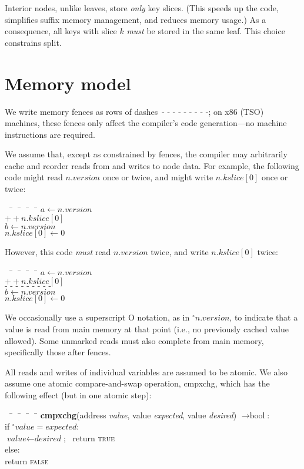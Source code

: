 \documentclass[11pt]{article}
\makeatletter
\newcommand{\FALSE}{\textsc{false}}
\newcommand{\TRUE}{\textsc{true}}
\newcommand{\V}[1]{\textit{#1}}
\newcommand{\readnow}[1]{\ensuremath{{}^\circ#1}}
\newcommand{\fencebase}{\text{- - - - - - - - -}}
\newcommand{\fence}{\ensuremath{\fencebase}}
\newcommand{\Returns}[1]{\ensuremath{\rightarrow\text{#1}}}
\newenvironment{programtabbing}%
  {\begingroup\parskip\z@\begin{tabbing}\quad\qquad~~\= \quad~~\= \quad~~\= \quad~~\=\kill}%
  {\unskip\end{tabbing}\endgroup}
\makeatother
\begin{document}
Interior nodes, unlike leaves, store \emph{only} key slices. (This
speeds up the code, simplifies suffix memory management, and reduces
memory usage.) As a consequence, all keys with slice \(k\) \emph{must}
be stored in the same leaf. This choice constrains split.


\section{Memory model}

We write memory fences as rows of dashes\ \fence; on x86 (TSO) machines,
these fences only affect the compiler's code generation---no machine
instructions are required.

We assume that, except as constrained by fences, the compiler may
arbitrarily cache and reorder reads from and writes to node data. For
example, the following code might read \(n.\V{version}\) once or twice,
and might write \(n.\V{kslice}[0]\) once or twice:

\begin{programtabbing}
\(a \gets n.\V{version}\) \\
\(++n.\V{kslice}[0]\) \\
\(b \gets n.\V{version}\) \\
\(n.\V{kslice}[0] \gets 0\)
\end{programtabbing}

\noindent
However, this code \emph{must} read \(n.\V{version}\) twice, and write
\(n.\V{kslice}[0]\) twice:

\begin{programtabbing}
\(a \gets n.\V{version}\) \\
\(++n.\V{kslice}[0]\) \\
\fence \\
\(b \gets n.\V{version}\) \\
\(n.\V{kslice}[0] \gets 0\)
\end{programtabbing}

We occasionally use a superscript O notation, as in
\(\readnow{n.\V{version}}\), to indicate that a value is
read from main memory at that point (i.e., no previously cached
value allowed). Some unmarked reads must also complete from main
memory, specifically those after fences.

All reads and writes of individual variables are assumed to be atomic.
We also assume one atomic compare-and-swap operation, cmpxchg, which has
the following effect (but in one atomic step):

\begin{programtabbing}
\textbf{cmpxchg}(address \V{value}, value \V{expected}, value
\V{desired}) \Returns{bool}: \\
\> if \(\readnow{\V{value}} = \V{expected}\): \\
\>\> \(\V{value} \gets \V{desired}\);~ return \TRUE \\
\> else: \\
\>\> return \FALSE
\end{programtabbing}
\end{document}
